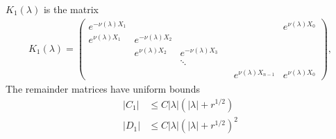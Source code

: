 \documentclass[thesis.tex]{subfiles}
\begin{document}
\begin{lemma}
$K_1(\lambda)$ is the matrix
\begin{align*}
K_1(\lambda) =  
\begin{pmatrix}
e^{-\nu(\lambda)X_1} & & & & & e^{\nu(\lambda)X_0} \\
e^{\nu(\lambda)X_1} & e^{-\nu(\lambda)X_2} \\
& e^{\nu(\lambda)X_2} & e^{-\nu(\lambda)X_3} \\
 & & \ddots & &&   \\
& & & & e^{\nu(\lambda)X_{n-1}} & e^{\nu(\lambda)X_0}
\end{pmatrix},
\end{align*}
The remainder matrices have uniform bounds
\begin{align}\label{centerjumprem}
|C_1| &\leq C |\lambda|(|\lambda| + r^{1/2}) \\
|D_1| &\leq C |\lambda|(|\lambda| + r^{1/2})^2
\end{align}


\end{lemma}
\end{document}
